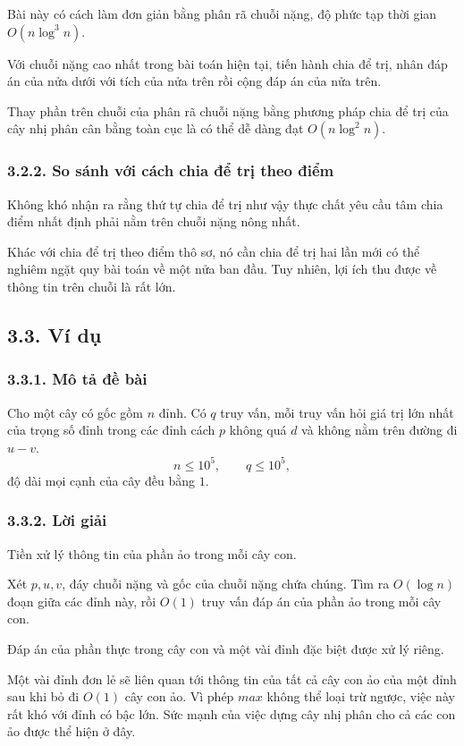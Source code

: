 \documentclass[11pt]{article}
\begin{document}
Bài này có cách làm đơn giản bằng phân rã chuỗi nặng, độ phức tạp thời gian
\(O(n\log^3 n)\).

Với chuỗi nặng cao nhất trong bài toán hiện tại, tiến hành chia để trị, nhân
đáp án của nửa dưới với tích của nửa trên rồi cộng đáp án của nửa trên.

Thay phần trên chuỗi của phân rã chuỗi nặng bằng phương pháp chia để trị của
cây nhị phân cân bằng toàn cục là có thể dễ dàng đạt \(O(n\log^2 n)\).

\subsubsection*{3.2.2. So sánh với cách chia để trị theo điểm}

Không khó nhận ra rằng thứ tự chia để trị như vậy thực chất yêu cầu tâm chia
điểm nhất định phải nằm trên chuỗi nặng nông nhất.

Khác với chia để trị theo điểm thô sơ, nó cần chia để trị hai lần mới có thể
nghiêm ngặt quy bài toán về một nửa ban đầu. Tuy nhiên, lợi ích thu được về
thông tin trên chuỗi là rất lớn.

\subsection*{3.3. Ví dụ}

\subsubsection*{3.3.1. Mô tả đề bài}

Cho một cây có gốc gồm \(n\) đỉnh. Có \(q\) truy vấn, mỗi truy vấn hỏi giá trị
lớn nhất của trọng số đỉnh trong các đỉnh cách \(p\) không quá \(d\) và không
nằm trên đường đi \(u-v\).
\[
  n\le10^5,\qquad q\le10^5,
\]
độ dài mọi cạnh của cây đều bằng \(1\).

\subsubsection*{3.3.2. Lời giải}

Tiền xử lý thông tin của phần ảo trong mỗi cây con.

Xét \(p,u,v\), đáy chuỗi nặng và gốc của chuỗi nặng chứa chúng. Tìm ra
\(O(\log n)\) đoạn giữa các đỉnh này, rồi \(O(1)\) truy vấn đáp án của phần ảo
trong mỗi cây con.

Đáp án của phần thực trong cây con và một vài đỉnh đặc biệt được xử lý riêng.

Một vài đỉnh đơn lẻ sẽ liên quan tới thông tin của tất cả cây con ảo của một
đỉnh sau khi bỏ đi \(O(1)\) cây con ảo. Vì phép \(max\) không thể loại trừ
ngược, việc này rất khó với đỉnh có bậc lớn. Sức mạnh của việc dựng cây nhị
phân cho cả các con ảo được thể hiện ở đây.
\end{document}
